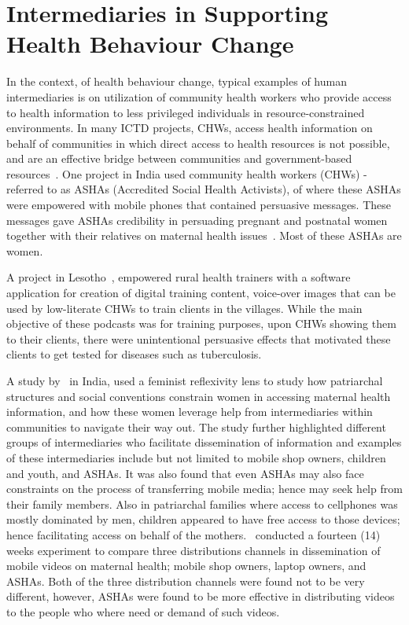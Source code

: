 \section{Intermediaries in Supporting Health Behaviour Change}
In the context, of health behaviour change, typical examples of human intermediaries is on utilization of community health workers who provide access to health information to less privileged individuals in resource-constrained environments.  In many ICTD projects, CHWs, access health information on behalf of communities in which direct access to health resources is not possible, and are an effective bridge between communities and government-based resources~\citep{katule2016leveraging}. One project in India used community health workers (CHWs) -referred to as  ASHAs (Accredited Social Health Activists), of where these ASHAs were empowered with mobile phones that contained persuasive messages. These messages gave ASHAs credibility in persuading pregnant and postnatal women together with their relatives on maternal health issues~\citep{ramachandran2010mobile,ramachandran2010research}. Most of these ASHAs are women.

A project in Lesotho~\citep{molapo2013software}, empowered rural health trainers with a software application for creation of digital  training  content, voice-over images  that can be used by low-literate CHWs to train clients in the villages. While the main objective of these podcasts was for training purposes, upon CHWs showing them to their clients, there were unintentional persuasive effects that motivated these clients to get tested for diseases such as tuberculosis.

A study by~\cite{kumar2015mobile} in India, used a feminist reflexivity lens to study how patriarchal structures and social conventions constrain women in accessing maternal health information, and how these women leverage help from intermediaries within communities to navigate their way out. The study further highlighted different groups of intermediaries who facilitate dissemination of information and examples of these intermediaries include but not limited to mobile shop owners, children and youth, and ASHAs.  It was also found that even ASHAs may also face constraints on the process of transferring mobile media; hence may seek help from their family members. Also in patriarchal families where access to cellphones was mostly dominated by men, children appeared to have free access to those devices; hence facilitating access on behalf of the mothers.~\cite{vashistha2016mobile} conducted a fourteen (14) weeks experiment to compare three distributions channels in dissemination of mobile videos on maternal health; mobile shop owners, laptop owners, and ASHAs. Both of the three distribution channels were found not to be very different, however, ASHAs were found to be more effective in distributing videos to the people who where need or demand of such videos.

